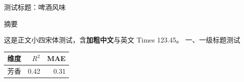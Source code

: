 \documentclass[12pt,a4paper]{article}
\begin{document}
\begin{center}{\heiti 测试标题：啤酒风味}\end{center}
\begin{center}{\heiti 摘\hspace{1em}要}\end{center}
这是正文小四宋体测试，含\textbf{加粗中文}与英文 Times 123.45。
一、一级标题测试
\begin{fittable}
\begin{tabular}{@{}lrr@{}}
\toprule 维度 & $R^2$ & MAE \\ \midrule
芳香 & 0.42 & 0.31 \\
\bottomrule
\end{tabular}
\end{fittable}
\end{document}
